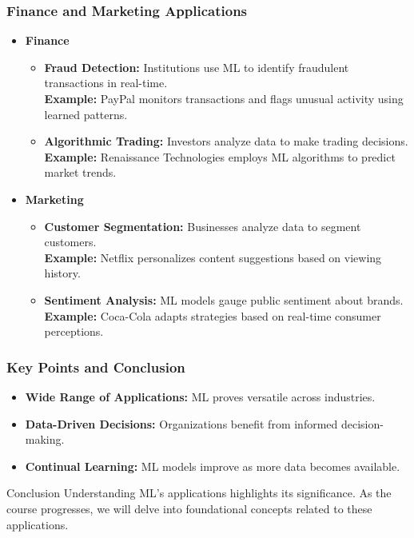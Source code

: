 \documentclass[aspectratio=169]{beamer}
\begin{document}
\begin{frame}[fragile]
    \frametitle{Finance and Marketing Applications}
    \begin{itemize}
        \item \textbf{Finance}
            \begin{itemize}
                \item \textbf{Fraud Detection:} Institutions use ML to identify fraudulent transactions in real-time. \\
                \textbf{Example:} PayPal monitors transactions and flags unusual activity using learned patterns.
                
                \item \textbf{Algorithmic Trading:} Investors analyze data to make trading decisions. \\
                \textbf{Example:} Renaissance Technologies employs ML algorithms to predict market trends.
            \end{itemize}

        \item \textbf{Marketing}
            \begin{itemize}
                \item \textbf{Customer Segmentation:} Businesses analyze data to segment customers. \\
                \textbf{Example:} Netflix personalizes content suggestions based on viewing history.
                
                \item \textbf{Sentiment Analysis:} ML models gauge public sentiment about brands. \\
                \textbf{Example:} Coca-Cola adapts strategies based on real-time consumer perceptions.
            \end{itemize}
    \end{itemize}
\end{frame}

\begin{frame}[fragile]
    \frametitle{Key Points and Conclusion}
    \begin{itemize}
        \item \textbf{Wide Range of Applications:} ML proves versatile across industries.
        \item \textbf{Data-Driven Decisions:} Organizations benefit from informed decision-making.
        \item \textbf{Continual Learning:} ML models improve as more data becomes available.
    \end{itemize}
    \begin{block}{Conclusion}
        Understanding ML's applications highlights its significance. As the course progresses, we will delve into foundational concepts related to these applications.
    \end{block}
\end{frame}
\end{document}
